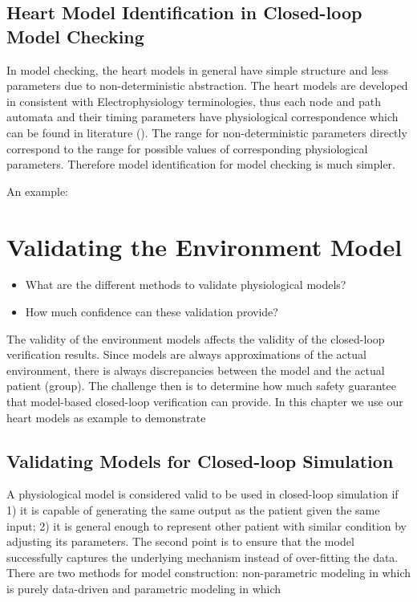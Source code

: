 \section{Heart Model Identification in Closed-loop Model Checking}
In model checking, the heart models in general have simple structure and less parameters due to non-deterministic abstraction. The heart models are developed in consistent with Electrophysiology terminologies, thus each node and path automata and their timing parameters have physiological correspondence which can be found in literature (\cite{josephson}). The range for non-deterministic parameters directly correspond to the range for possible values of corresponding physiological parameters. Therefore model identification for model checking is much simpler. 

An example: 







\chapter{Validating the Environment Model}
\begin{itemize}
	\item What are the different methods to validate physiological models?
    \item How much confidence can these validation provide?
\end{itemize}
The validity of the environment models affects the validity of the closed-loop verification results. Since models are always approximations of the actual environment, there is always discrepancies between the model and the actual patient (group). The challenge then is to determine how much safety guarantee that model-based closed-loop verification can provide. In this chapter we use our heart models as example to demonstrate

\section{Validating Models for Closed-loop Simulation}
A physiological model is considered valid to be used in closed-loop simulation if 1) it is capable of generating the same output as the patient given the same input; 2) it is general enough to represent other patient with similar condition by adjusting its parameters. The second point is to ensure that the model successfully captures the underlying mechanism instead of over-fitting the data. There are two methods for model construction: non-parametric modeling in which is purely data-driven and parametric modeling in which 

